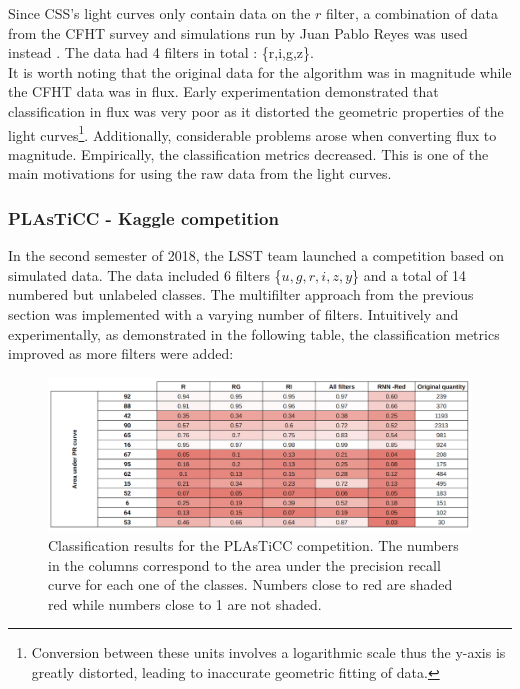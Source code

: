 Since CSS's light curves only contain data on the $r$ filter\cite{catalina}, a combination of data from the CFHT survey\cite{cfht} and simulations run by Juan Pablo Reyes was used instead . The data had 4 filters in total : \{r,i,g,z\}.\\

It is worth noting that the original data for the algorithm was in magnitude while the CFHT data was in flux. Early experimentation demonstrated that classification in flux was very poor as it distorted the geometric properties of the light curves\footnote{Conversion between these units involves a logarithmic scale thus the y-axis is greatly distorted, leading to inaccurate geometric fitting of data.}. Additionally, considerable problems arose when converting flux to magnitude. Empirically, the classification metrics decreased. This is one of the main motivations for using the raw data from the light curves. 

\subsubsection{PLAsTiCC - Kaggle competition}

In the second semester of 2018, the LSST team launched a competition based on simulated data\cite{kaggle}. The data included 6 filters \{$u, g, r, i, z, y$\} and a total of 14 numbered but unlabeled classes. The multifilter approach from the previous section was implemented with a varying number of filters. Intuitively and experimentally, as demonstrated in the following table, the classification metrics improved as more filters were added: 

\begin{figure}[H]\label{competition}
  \centering
  \includegraphics[width=1.05\textwidth]{images/competition.png}
  \caption{Classification results for the PLAsTiCC competition. The numbers in the columns correspond to the area under the precision recall curve for each one of the classes. Numbers close to red are shaded red while numbers close to 1 are not shaded.}
\end{figure}

